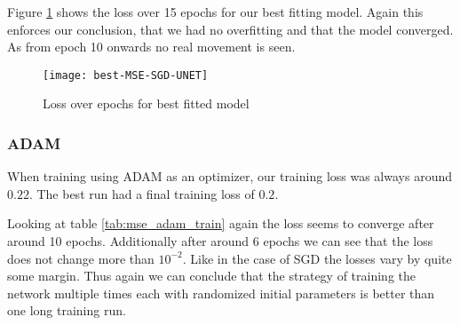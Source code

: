 Figure \ref{im:best-MSE-SGD-UNET} shows the loss over 15 epochs for
our best fitting model. Again this enforces our conclusion, that we had no overfitting and that the model converged.
As from epoch 10 onwards no real movement is seen.


\begin{figure}[h]
\texttt{[image: best-MSE-SGD-UNET]}
\caption{\label{im:best-MSE-SGD-UNET} Loss over epochs for best fitted model}
\end{figure}

\newpage

\subsubsection{ADAM}
When training using ADAM as an optimizer, our training loss was always around $0.22$. 
The best run had a final training loss of $0.2$. 

Looking at table \ref{tab:mse_adam_train} again the loss seems to converge after around 10 epochs. 
Additionally after around 6 epochs we can see that the loss does not change more than $10^{-2}$. Like in the 
case of SGD the losses vary by quite some margin. Thus again we can conclude that the 
strategy of training the network multiple times each with randomized initial parameters
is better than one long training run.

